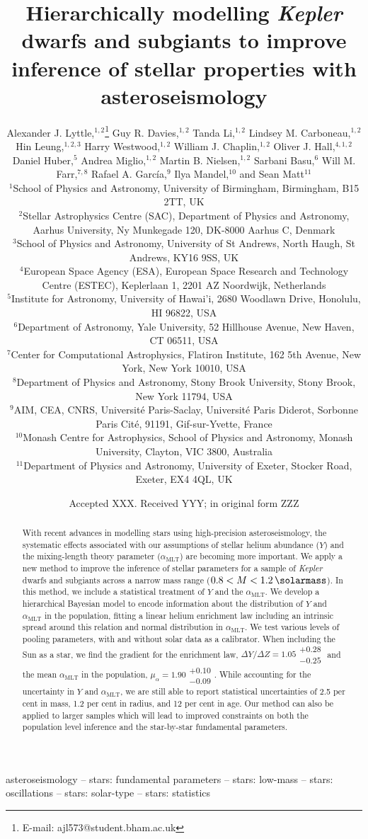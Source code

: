 \documentclass[a4paper,fleqn,usenatbib]{mnras}
\title[Hierarchically modelling dwarfs and subgiants]{%
    Hierarchically modelling \emph{Kepler} dwarfs and subgiants to improve inference of stellar properties with asteroseismology
}
\author[A. J. Lyttle et al.]{%
Alexander J. Lyttle,$^{1,2}$\thanks{E-mail: ajl573@student.bham.ac.uk}
Guy R. Davies,$^{1,2}$
Tanda Li,$^{1,2}$
Lindsey M. Carboneau,$^{1,2}$
\newauthor
Hin Leung,$^{1,2,3}$
Harry Westwood,$^{1,2}$
William J. Chaplin,$^{1,2}$
Oliver J. Hall,$^{4,1,2}$
\newauthor
Daniel Huber,$^{5}$
Andrea Miglio,$^{1,2}$
Martin B. Nielsen,$^{1,2}$
Sarbani Basu,$^{6}$
\newauthor
Will M. Farr,$^{7,8}$
Rafael A. Garc\'ia,$^{9}$
Ilya Mandel,$^{10}$
and Sean Matt$^{11}$
\\
$^{1}$School of Physics and Astronomy, University of Birmingham, Birmingham, B15 2TT, UK\\
$^{2}$Stellar Astrophysics Centre (SAC), Department of Physics and Astronomy, Aarhus University, Ny Munkegade 120, DK-8000 Aarhus C, Denmark\\
$^{3}$School of Physics and Astronomy, University of St Andrews, North Haugh, St Andrews, KY16 9SS, UK\\
$^{4}$European Space Agency (ESA), European Space Research and Technology Centre (ESTEC), Keplerlaan 1, 2201 AZ Noordwijk, Netherlands\\
$^{5}$Institute for Astronomy, University of Hawai'i, 2680 Woodlawn Drive, Honolulu, HI 96822, USA\\
$^{6}$Department of Astronomy, Yale University, 52 Hillhouse Avenue, New Haven, CT 06511, USA\\
$^{7}$Center for Computational Astrophysics, Flatiron Institute, 162 5th Avenue, New York, New York 10010, USA\\
$^{8}$Department of Physics and Astronomy, Stony Brook University, Stony Brook, New York 11794, USA\\
$^{9}$AIM, CEA, CNRS, Universit\'e Paris-Saclay, Universit\'e Paris Diderot, Sorbonne Paris Cit\'e, 91191, Gif-sur-Yvette, France\\
$^{10}$Monash Centre for Astrophysics, School of Physics and Astronomy, Monash University, Clayton, VIC 3800, Australia\\
$^{11}$Department of Physics and Astronomy, University of Exeter, Stocker Road, Exeter, EX4 4QL, UK
}
\date{Accepted XXX. Received YYY; in original form ZZZ}
\newcommand{\mlt}{\ensuremath{{\alpha_\mathrm{MLT}}}}
\begin{document}
\label{firstpage}
\pagerange{\pageref{firstpage}--\pageref{lastpage}}
\maketitle

\begin{abstract}
    With recent advances in modelling stars using high-precision asteroseismology, the systematic effects associated with our assumptions of stellar helium abundance ($Y$) and the mixing-length theory parameter ($\mlt$) are becoming more important. We apply a new method to improve the inference of stellar parameters for a sample of \emph{Kepler} dwarfs and subgiants across a narrow mass range ($0.8 < M < \SI{1.2}{\solarmass}$). In this method, we include a statistical treatment of $Y$ and the $\mlt$. We develop a hierarchical Bayesian model to encode information about the distribution of $Y$ and $\mlt$ in the population, fitting a linear helium enrichment law including an intrinsic spread around this relation and normal distribution in $\mlt$. We test various levels of pooling parameters, with and without solar data as a calibrator. When including the Sun as a star, we find the gradient for the enrichment law, $\Delta Y / \Delta Z = 1.05\substack{+0.28\\-0.25}$ and the mean $\mlt$ in the population, $\mu_\alpha = 1.90\substack{+0.10\\-0.09}$. While accounting for the uncertainty in $Y$ and $\mlt$, we are still able to report statistical uncertainties of 2.5 per cent in mass, 1.2 per cent in radius, and 12 per cent in age. Our method can also be applied to larger samples which will lead to improved constraints on both the population level inference and the star-by-star fundamental parameters.%
\end{abstract}

\begin{keywords}

asteroseismology -- stars: fundamental parameters -- stars: low-mass -- stars: oscillations -- stars: solar-type -- stars: statistics

\end{keywords}

\end{document}
